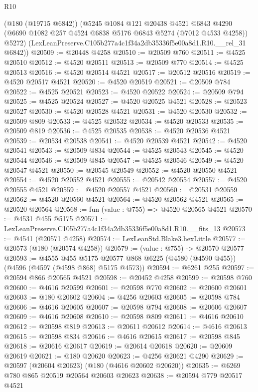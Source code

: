 \begin{lexlean}{R10}
\begin{coremodule}
      (@180 (@19715 @6842))
      (@5245
        @1084
        @121
        @20438
        @4521
        @6843
        @4290
        (@6690 @1082 @257 @4524 @6838 @5176 @6843 @5274 (@7012 @4533 @4258))
        @5272)
      (LexLeanPreserve.C105b277a4c1f34a2db35336f5e00a8d1.R10.__rel_31 @6842))
@20509 := @20448 @4258
@20510 := @20509 @760
@20511 := @4525 @20510
@20512 := @4520 @20511
@20513 := @20509 @770
@20514 := @4525 @20513
@20516 := @4520 @20514 @4521
@20517 := @20512 @20516
@20519 := @4520 @20517 @4521
@20520 := @4520 @20519
@20521 := @20509 @784
@20522 := @4525 @20521
@20523 := @4520 @20522
@20524 := @20509 @794
@20525 := @4525 @20524
@20527 := @4520 @20525 @4521
@20528 := @20523 @20527
@20530 := @4520 @20528 @4521
@20531 := @4520 @20530
@20532 := @20509 @809
@20533 := @4525 @20532
@20534 := @4520 @20533
@20535 := @20509 @819
@20536 := @4525 @20535
@20538 := @4520 @20536 @4521
@20539 := @20534 @20538
@20541 := @4520 @20539 @4521
@20542 := @4520 @20541
@20543 := @20509 @834
@20544 := @4525 @20543
@20545 := @4520 @20544
@20546 := @20509 @845
@20547 := @4525 @20546
@20549 := @4520 @20547 @4521
@20550 := @20545 @20549
@20552 := @4520 @20550 @4521
@20554 := @4520 @20552 @4521
@20555 := @20542 @20554
@20557 := @4520 @20555 @4521
@20559 := @4520 @20557 @4521
@20560 := @20531 @20559
@20562 := @4520 @20560 @4521
@20564 := @4520 @20562 @4521
@20565 := @20520 @20564
@20568 := fun (value : @755) => @4520 @20565 @4521
@20570 := @4531 @455 @5175
@20571 := LexLeanPreserve.C105b277a4c1f34a2db35336f5e00a8d1.R10.__fits_13
@20573 := @4541 (@20571 @4258)
@20574 := LexLeanStd.Blake3.hexLittle
@20577 := @20573 (@180 (@20574 @4258))
@20579 := (value : @755) -> @20570 @20577
@20593 := @4555
    @455
    @5175
    @20577
    @868
    @6225
    (@4580 (@4590 @455))
    (@4596 (@4597 (@4598 @868) @5175 @4573))
@20594 := @6261 @255
@20597 := @20594 @866 @20565 @4521
@20598 := @20452 @4258
@20599 := @20598 @760
@20600 := @4616 @20599
@20601 := @20598 @770
@20602 := @20600 @20601
@20603 := @180 @20602
@20604 := @4256 @20603
@20605 := @20598 @784
@20606 := @4616 @20605
@20607 := @20598 @794
@20608 := @20606 @20607
@20609 := @4616 @20608
@20610 := @20598 @809
@20611 := @4616 @20610
@20612 := @20598 @819
@20613 := @20611 @20612
@20614 := @4616 @20613
@20615 := @20598 @834
@20616 := @4616 @20615
@20617 := @20598 @845
@20618 := @20616 @20617
@20619 := @20614 @20618
@20620 := @20609 @20619
@20621 := @180 @20620
@20623 := @4256 @20621 @4290
@20629 := @20597 (@20604 @20623) (@180 (@4616 @20602 @20620))
@20635 := @6269 @780 @865 @20519 @20564 @20603 @20623
@20638 := @20594 @779 @20517 @4521

\end{coremodule}
\end{lexlean}
